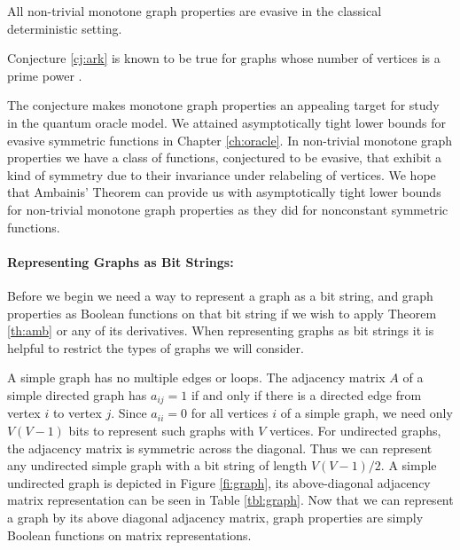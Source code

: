 \begin{conj}
\label{cj:ark}
All non-trivial monotone graph properties are evasive in the classical
deterministic setting.
\end{conj}

Conjecture \ref{cj:ark} is known to be true for graphs whose number of
vertices is a prime power \cite{lovasz94evasive}.

The conjecture makes monotone graph properties an appealing target for
study in the quantum oracle model.  We attained asymptotically tight
lower bounds for evasive symmetric functions in Chapter
\ref{ch:oracle}.  In non-trivial monotone graph properties we have a
class of functions, conjectured to be evasive, that exhibit a kind of
symmetry due to their invariance under relabeling of vertices.  We
hope that Ambainis' Theorem can provide us with asymptotically tight
lower bounds for non-trivial monotone graph properties as they did for
nonconstant symmetric functions.

\paragraph{Representing Graphs as Bit Strings:}
\label{sec:gbs}

Before we begin we need a way to represent a graph as a bit string,
and graph properties as Boolean functions on that bit string if we
wish to apply Theorem \ref{th:amb} or any of its derivatives.  When
representing graphs as bit strings it is helpful to restrict the types
of graphs we will consider.

A simple graph has no multiple edges or loops.  The adjacency matrix
$A$ of a simple directed graph has $a_{ij} = 1$ if and only if there
is a directed edge from vertex $i$ to vertex $j$.  Since $a_{ii} = 0$
for all vertices $i$ of a simple graph, we need only $V(V-1)$ bits to
represent such graphs with $V$ vertices.  For undirected graphs, the
adjacency matrix is symmetric across the diagonal.  Thus we can
represent any undirected simple graph with a bit string of length
$V(V-1)/2$.  A simple undirected graph is depicted in Figure
\ref{fi:graph}, its above-diagonal adjacency matrix representation can
be seen in Table \ref{tbl:graph}.  Now that we can represent a graph
by its above diagonal adjacency matrix, graph properties are simply
Boolean functions on matrix representations.

